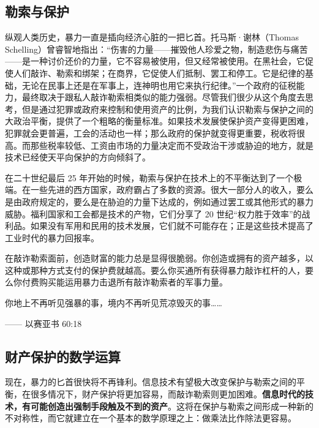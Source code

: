 \subsection{勒索与保护}
纵观人类历史，暴力一直是插向经济心脏的一把匕首。托马斯·谢林（Thomas Schelling）曾睿智地指出：“伤害的力量——摧毁他人珍爱之物，制造悲伤与痛苦——是一种讨价还价的力量，它不容易被使用，但又经常被使用。在黑社会，它促使人们敲诈、勒索和绑架；在商界，它促使人们抵制、罢工和停工。它是纪律的基础，无论在民事上还是在军事上，连神明也用它来执行纪律。”一个政府的征税能力，最终取决于跟私人敲诈勒索相类似的能力强弱。尽管我们很少从这个角度去思考，但是通过犯罪或政府来控制和使用资产的比例，为我们认识勒索与保护之间的大政治平衡，提供了一个粗略的衡量标准。如果技术发展使保护资产变得更困难，犯罪就会更普遍，工会的活动也一样；那么政府的保护就变得更重要，税收将很高。而那些税率较低、工资由市场的力量决定而不受政治干涉或胁迫的地方，就是技术已经使天平向保护的方向倾斜了。

在二十世纪最后 25 年开始的时候，勒索与保护在技术上的不平衡达到了一个极端。在一些先进的西方国家，政府霸占了多数的资源。很大一部分人的收入，要么是由政府规定的，要么是在胁迫的力量下达成的，例如通过罢工或其他形式的暴力威胁。福利国家和工会都是技术的产物，它们分享了 20 世纪“权力胜于效率”的战利品。如果没有军用和民用的技术发展，它们就不可能存在；正是这些技术提高了工业时代的暴力回报率。

在敲诈勒索面前，创造财富的能力总是显得很脆弱。你创造或拥有的资产越多，以这种或那种方式支付的保护费就越高。要么你买通所有获得暴力敲诈杠杆的人，要么你付费购买能运用暴力击退所有敲诈勒索者的军事力量。


\begin{tcolorbox}
\kaishu 你地上不再听见强暴的事，境内不再听见荒凉毁灭的事……
\begin{flushright}
—— 以赛亚书 60:18
\end{flushright}
\end{tcolorbox}

\subsection{财产保护的数学运算}
现在，暴力的匕首很快将不再锋利。信息技术有望极大改变保护与勒索之间的平衡，在很多情况下，财产保护将更加容易，而敲诈勒索则更加困难。\textbf{信息时代的技术，有可能创造出强制手段触及不到的资产}。这将在保护与勒索之间形成一种新的不对称性，而它就建立在一个基本的数学原理之上：做乘法比作除法更容易。

